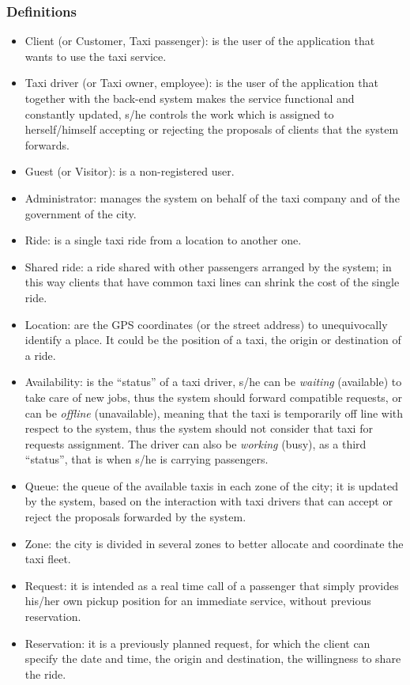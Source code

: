 \documentclass[a4paper,11pt]{report} %
\begin{document}
	\subsubsection{Definitions}
		\begin{itemize}
			\item Client (or Customer, Taxi passenger): is the user of the application that wants to use the taxi service.
			\item Taxi driver (or Taxi owner, employee): is the user of the application that together with the back-end system makes the service functional and constantly updated, s/he controls the work which is assigned to herself/himself accepting or rejecting the proposals of clients that the system forwards. 
			\item Guest (or Visitor): is a non-registered user.
			\item Administrator: manages the system on behalf of the taxi company and of the government of the city.
			\item Ride: is a single taxi ride from a location to another one.
			\item Shared ride: a ride shared with other passengers arranged by the system; in this way clients that have common taxi lines can shrink the cost of the single ride.
			\item Location: are the GPS coordinates (or the street address) to unequivocally identify a place. It could be the position of a taxi, the origin or destination of a ride.
			\item Availability: is the ``status'' of a taxi driver, s/he can be \textit{waiting} (available) to take care of new jobs, thus the system should forward compatible requests, or can be \textit{offline} (unavailable), meaning that the taxi is temporarily off line with respect to the system, thus the system should not consider that taxi for requests assignment. The driver can also be \textit{working} (busy), as a third ``status'', that is when s/he is carrying passengers.
			\item Queue: the queue of the available taxis in each zone of the city; it is updated by the system, based on the interaction with taxi drivers that can accept or reject the proposals forwarded by the system. 
			\item Zone: the city is divided in several zones to better allocate and coordinate the taxi fleet.
			\item Request: it is intended as a real time call of a passenger that simply provides his/her own pickup position for an immediate service, without previous reservation.
			\item Reservation: it is a previously planned request, for which the client can specify the date and time, the origin and destination, the willingness to share the ride.
		\end{itemize}
		
\end{document}
